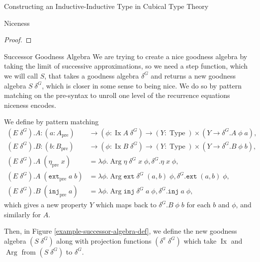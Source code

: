 \documentclass[runningheads]{llncs}
\DeclareMathOperator{\USet}{Type}
\DeclareMathOperator{\Arg}{Arg}
\DeclareMathOperator{\Ix}{Ix}
\newcommand{\pre}[1]{{#1}_\text{pre}}
\newcommand{\join}{\texttt{ext}}
\newcommand{\inj}{\texttt{inj}}
\begin{document}
\begin{section}{Constructing an Inductive-Inductive Type in Cubical Type Theory}
\begin{subsection}{Niceness}
\begin{proof}
\end{proof}

\end{subsection}

\begin{subsection}{Successor Goodness Algebra}\label{ex-successor-alg}
We are trying to create a nice goodness algebra by taking the limit of successive approximations, so we need a step function, which we will call $S$, that takes a goodness algebra $\delta^G$ and returns a new goodness algebra $S\;\delta^G$, which is closer in some sense to being nice. We do so by pattern matching on the pre-syntax to unroll one level of the recurrence equations niceness encodes.

We define by pattern matching \begin{align*}
(E\;\delta^G).A : (a : \pre{A}) &\to (\phi : \Ix A\;\delta^G) \to (Y : \USet) \times (Y \to \delta^G.A\;\phi\;a),\\
(E\;\delta^G).B : (b : \pre{B}) &\to (\phi : \Ix B\;\delta^G) \to (Y : \USet) \times (Y \to \delta^G.B\;\phi\;b),\\
(E\;\delta^G).A\;(\pre{\eta}\;x) &= \lambda \phi. \Arg\eta\;\delta^G\;x\;\phi, \delta^G.\eta\;x\;\phi,\\
(E\;\delta^G).A\;(\pre{\join}\;a\;b) &= \lambda \phi. \Arg\join\;\delta^G\;(a, b)\;\phi, \delta^G.\join\;(a, b)\;\phi,\\
(E\;\delta^G).B\;(\pre{\inj}\;a) &= \lambda \phi. \Arg\inj\;\delta^G\;a\;\phi, \delta^G.\inj\;a\;\phi,
\end{align*}
which gives a new property $Y$ which maps back to $\delta^G.B\;\phi\;b$ for each $b$ and $\phi$, and similarly for $A$.

Then, in Figure \ref{example-successor-algebra-def}, we define the new goodness algebra $(S\;\delta^G)$ along with projection functions $(\delta^\pi\;\delta^G)$ which take $\Ix$ and $\Arg$ from $(S\;\delta^G)$ to $\delta^G$.

\begin{figure}[htpb]\begin{flushleft}


\end{flushleft}
\end{figure}
\end{subsection}
\end{section}
\end{document}
